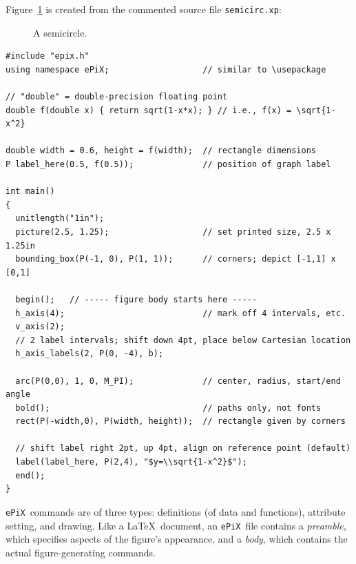 \documentclass[12pt]{report}
\newcommand{\code}[1]{\texttt{#1}}
\newcommand{\filename}[1]{\texttt{#1}}
\newcommand{\ePiX}{\code{ePiX}}
\begin{document}
Figure~\ref{fig:example} is created from the commented source file
\filename{semicirc.xp}:
\begin{figure}[tb]
\begin{center}

\caption{A semicircle.}
\label{fig:example}
\end{center}
\end{figure}
\begin{footnotesize}
\begin{verbatim}
#include "epix.h"
using namespace ePiX;                   // similar to \usepackage

// "double" = double-precision floating point
double f(double x) { return sqrt(1-x*x); } // i.e., f(x) = \sqrt{1-x^2}

double width = 0.6, height = f(width);  // rectangle dimensions
P label_here(0.5, f(0.5));              // position of graph label

int main() 
{
  unitlength("1in");
  picture(2.5, 1.25);                   // set printed size, 2.5 x 1.25in
  bounding_box(P(-1, 0), P(1, 1));      // corners; depict [-1,1] x [0,1]

  begin();   // ----- figure body starts here -----
  h_axis(4);                            // mark off 4 intervals, etc.
  v_axis(2);  
  // 2 label intervals; shift down 4pt, place below Cartesian location
  h_axis_labels(2, P(0, -4), b);    

  arc(P(0,0), 1, 0, M_PI);              // center, radius, start/end angle
  bold();                               // paths only, not fonts
  rect(P(-width,0), P(width, height));  // rectangle given by corners

  // shift label right 2pt, up 4pt, align on reference point (default)
  label(label_here, P(2,4), "$y=\\sqrt{1-x^2}$");
  end();
}
\end{verbatim}
\end{footnotesize}
\ePiX\ commands are of three types: definitions (of data and
functions), attribute setting, and drawing.  Like a \LaTeX\ document,
an \ePiX\ file contains a \emph{preamble}, which
specifies aspects of the figure's appearance, and a \emph{body}, which
contains the actual figure-generating commands.
\end{document}
